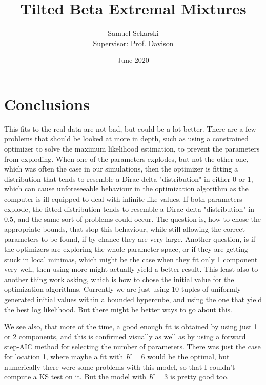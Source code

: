 \documentclass[10pt]{report}
\title{Tilted Beta Extremal Mixtures}
\author{Samuel Sekarski \\ Supervisor: Prof. Davison}
\date{June 2020}
\begin{document}
\maketitle



\tableofcontents
\listoffigures







\chapter{Conclusions}
This fits to the real data are not bad, but could be a lot better. There are a few problems that should be looked at more in depth, such as using a constrained optimizer to solve the maximum likelihood estimation, to prevent the parameters from exploding. When one of the parameters explodes, but not the other one, which was often the case in our simulations, then the optimizer is fitting a distribution that tends to resemble a Dirac delta "distribution" in either 0 or 1, which can cause unforeseeable behaviour in the optimization algorithm as the computer is ill equipped to deal with infinite-like values. If both parameters explode, the fitted distribution tends to resemble a Dirac delta "distribution" in 0.5, and the same sort of problems could occur. The question is, how to chose the appropriate bounds, that stop this behaviour, while still allowing the correct parameters to be found, if by chance they are very large.
Another question, is if the optimizers are exploring the whole parameter space, or if they are getting stuck in local minimas, which might be the case when they fit only 1 component very well, then using more might actually yield a better result. 
This least also to another thing work asking, which is how to chose the initial value for the optimization algorithms. Currently we are just using 10 tuples of uniformly generated initial values within a bounded hypercube, and using the one that yield the best log likelihood. But there might be better ways to go about this.

We see also, that more of the time, a good enough fit is obtained by using just 1 or 2 components, and this is confirmed visually as well as by using a forward step-AIC method for selecting the number of parameters. There was just the case for location 1, where maybe a fit with $K=6$ would be the optimal, but numerically there were some problems with this model, so that I couldn't compute a KS test on it. But the model with $K=3$ is pretty good too.
\end{document}
